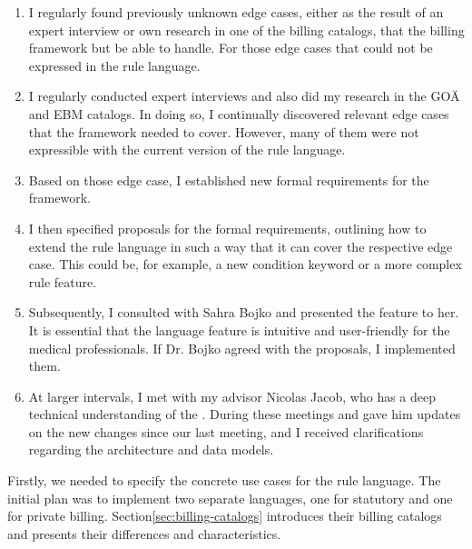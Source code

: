 \begin{enumerate}
    \item I regularly found previously unknown edge cases, either as the result of an expert interview or own research in one of the billing catalogs, that the billing framework but be able to handle.
    For those edge cases that could not be expressed in the rule language.
    \item I regularly conducted expert interviews and also did my research in the GOÄ and EBM catalogs.
    In doing so, I continually discovered relevant edge cases that the framework needed to cover.
    However, many of them were not expressible with the current version of the rule language.
    \item Based on those edge case, I established new formal requirements for the framework.
    \item I then specified proposals for the formal requirements, outlining how to extend the rule language in such a way that it can cover the respective edge case.
    This could be, for example, a new condition keyword or a more complex rule feature.
    \item Subsequently, I consulted with Sahra Bojko and presented the feature to her.
    It is essential that the language feature is intuitive and user-friendly for the medical professionals.
    If Dr. Bojko agreed with the proposals, I implemented them.
    \item At larger intervals, I met with my advisor Nicolas Jacob, who has a deep technical understanding of the \AVS.
    During these meetings and gave him updates on the new changes since our last meeting, and I received clarifications regarding the \AV architecture and data models.
\end{enumerate}

Firstly, we needed to specify the concrete use cases for the rule language.
The initial plan was to implement two separate languages, one for statutory and one for private billing.
Section\ref{sec:billing-catalogs} introduces their billing catalogs and presents their differences and characteristics.

